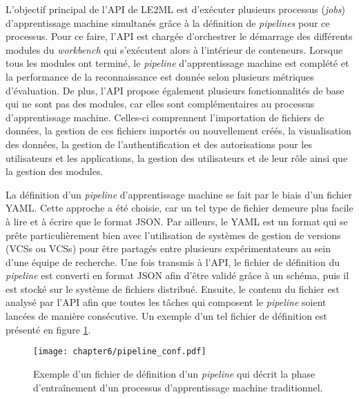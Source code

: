 L'objectif principal de l'\acs{API} de \acs{LE2ML} est d'exécuter plusieurs processus (\emph{jobs}) d'apprentissage machine simultanés grâce à la définition de \textit{pipelines} pour ce processus. Pour ce faire, l'\acs{API} est chargée d'orchestrer le démarrage des différents modules du \textit{workbench} qui s'exécutent alors à l'intérieur de conteneurs. Lorsque tous les modules ont terminé, le \textit{pipeline} d'apprentissage machine est complété et la performance de la reconnaissance est donnée selon plusieurs métriques d'évaluation. De plus, l'\acs{API} propose également plusieurs fonctionnalités de base qui ne sont pas des modules, car elles sont complémentaires au processus d'apprentissage machine. Celles-ci comprennent l'importation de fichiers de données, la gestion de ces fichiers importés ou nouvellement créés, la visualisation des données, la gestion de l'authentification et des autorisations pour les utilisateurs et les applications, la gestion des utilisateurs et de leur rôle ainsi que la gestion des modules.

La définition d'un \textit{pipeline} d'apprentissage machine se fait par le biais d'un fichier \ac{YAML}. Cette approche a été choisie, car un tel type de fichier demeure plus facile à lire et à écrire que le format \acs{JSON}. Par ailleurs, le \acs{YAML} est un format qui se prête particulièrement bien avec l'utilisation de systèmes de gestion de versions (\aclp{VCS} ou \acsp{VCS}) pour être partagés entre plusieurs expérimentateurs au sein d'une équipe de recherche. Une fois transmis à l'\acs{API}, le fichier de définition du \textit{pipeline} est converti en format JSON afin d'être validé grâce à un schéma, puis il est stocké sur le système de fichiers distribué. Ensuite, le contenu du fichier est analysé par l'\acs{API} afin que toutes les tâches qui composent le \textit{pipeline} soient lancées de manière consécutive. Un exemple d'un tel fichier de définition est présenté en figure \ref{fig:pipeline_conf}.

\begin{figure}[H]
	\centering
	\texttt{[image: chapter6/pipeline\_conf.pdf]}
        \caption{Exemple d'un fichier de définition d'un \textit{pipeline} qui décrit la phase d'entraînement d'un processus d'apprentissage machine traditionnel.}
	\label{fig:pipeline_conf}
\end{figure}

